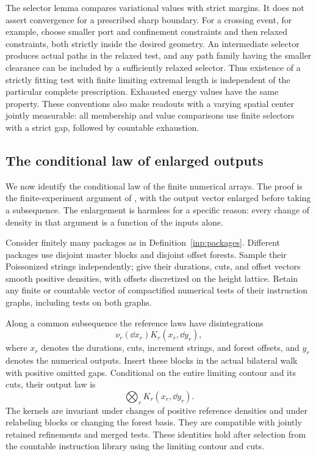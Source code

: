 The selector lemma compares variational values with strict margins.
It does not assert convergence for a prescribed sharp boundary.
For a crossing event, for example, choose smaller port and confinement
constraints and then relaxed constraints, both strictly inside the
desired geometry.  An intermediate selector produces actual paths
in the relaxed test, and any path family having the smaller clearance
can be included by a sufficiently relaxed selector.  Thus existence
of a strictly fitting test with finite limiting extremal length is
independent of the particular complete prescription.  Exhausted
energy values have the same property.  These conventions also make
readouts with a varying spatial center jointly measurable: all
membership and value comparisons use finite selectors with a strict
gap, followed by countable exhaustion.

\subsection{The conditional law of enlarged outputs}

We now identify the conditional law of the finite numerical arrays.
The proof is the finite-experiment argument of \cite{MetricMaps},
with the output vector enlarged before taking a subsequence.
The enlargement is harmless for a specific reason: every change
of density in that argument is a function of the inputs alone.

\begin{lemma}
\label{inp:kernel-transfer}
Consider finitely many packages as in Definition~\ref{inp:packages}.
Different packages use disjoint master blocks and disjoint offset
forests.  Sample their Poissonized strings independently; give their
durations, cuts, and offset vectors smooth positive densities, with
offsets discretized on the height lattice.  Retain any finite or
countable vector of compactified numerical tests of their instruction
graphs, including tests on both graphs.

Along a common subsequence the reference laws have disintegrations
\[
 \nu_r(\dd x_r)K_r(x_r,\dd y_r),
\]
where $x_r$ denotes the durations, cuts, increment strings, and
forest offsets, and $y_r$ denotes the numerical outputs.
Insert these blocks in the actual bilateral walk with positive
omitted gaps.  Conditional on the entire limiting contour and its
cuts, their output law is
\begin{equation}\label{inp:conditional-product}
             \bigotimes_r K_r(x_r,\dd y_r).
\end{equation}
The kernels are invariant under changes of positive reference
densities and under relabeling blocks or changing the forest basis.
They are compatible with jointly retained refinements and merged
tests.  These identities hold after selection from the countable
instruction library using the limiting contour and cuts.
\end{lemma}

